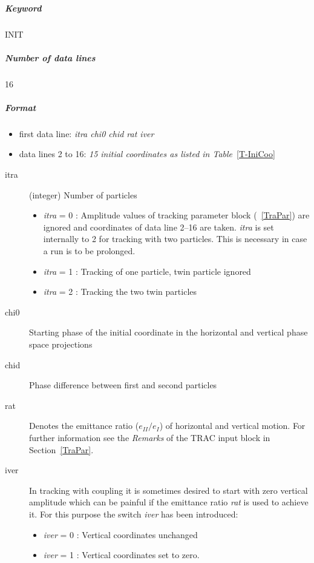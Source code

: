 \subparagraph{Keyword} INIT \subparagraph{Number of data lines} 16

\subparagraph{Format}
\begin{itemize}
\item first data line: {\em itra chi0 chid rat iver}
\item data lines 2 to 16: {\em 15 initial coordinates as listed in Table}~\ref{T-IniCoo}
\end{itemize}

\begin{description}
\item [itra] (integer) Number of particles
 \begin{itemize}
 \item {\em itra} \/= 0 : Amplitude values of tracking parameter block
   (~\ref{TraPar}) are ignored and coordinates of data line 2--16 are
   taken. {\em itra} \/is set internally to 2 for tracking with two
   particles.  This is necessary in case a run is to be prolonged.
 \item {\em itra} \/= 1 : Tracking of one particle, twin particle
   ignored
 \item {\em itra} \/= 2 : Tracking the two twin particles
 \end{itemize}
\item [chi0] Starting phase of the initial coordinate in the
  horizontal and vertical phase space projections
\item [chid] Phase difference between first and second particles
\item [rat] Denotes the emittance ratio ($e_{II}/e_I$) of horizontal
  and vertical motion. For further information see the \emph{Remarks} of the TRAC input block in Section~\ref{TraPar}.
\item [iver] In tracking with coupling it is sometimes desired to
  start with zero vertical amplitude which can be painful if the
  emittance ratio {\em rat} \/is used to achieve it. For this purpose
  the switch {\em iver} \/has been introduced:
\begin{itemize}
\item {\em iver} \/= 0 : Vertical coordinates unchanged
\item {\em iver} \/= 1 : Vertical coordinates set to zero.
\end{itemize}
\end{description}

